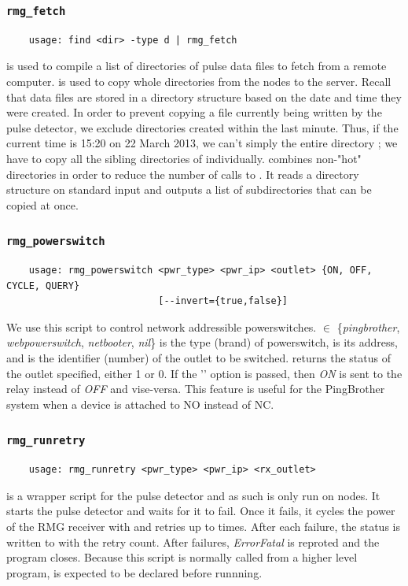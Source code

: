 \documentclass[letter]{article}
\begin{document}
\subsubsection{\texttt{rmg\_fetch}}
\begin{verbatim}
    usage: find <dir> -type d | rmg_fetch 
\end{verbatim}
 is used to compile a list of directories of pulse data files to fetch
from a remote computer.  is used to copy whole directories from the nodes 
to the server. Recall that data files are stored in a directory structure 
based on the date and time they were created. In order to prevent copying a file currently 
being written by the pulse detector, we exclude directories created within the 
last minute. Thus, if the current time is 15:20 on 22 March 2013, we can't simply 
the entire directory ; we have to copy all the sibling
directories of  individually. 
combines non-"hot" directories in order to reduce the number of calls to . It reads
a directory structure on standard input and outputs a list of subdirectories that can be 
copied at once. 
  
  
\subsubsection{\texttt{rmg\_powerswitch}}
\begin{verbatim}
    usage: rmg_powerswitch <pwr_type> <pwr_ip> <outlet> {ON, OFF, CYCLE, QUERY} 
                           [--invert={true,false}]
\end{verbatim}
We use this script to control network addressible powerswitches.  $
\in$ \{\textit{pingbrother}, \textit{webpowerswitch}, \textit{netbooter}, \textit{nil}\} is the 
type (brand) of powerswitch,  is its address, and  is 
the identifier (number) of the outlet to be switched.  returns the status of the 
outlet specified, either 1 or 0. If the '' option is passed, then 
\textit{ON} is sent to the relay instead of \textit{OFF} and vise-versa. This feature is 
useful for the PingBrother system when a device is attached to NO instead of NC. 


\subsubsection{\texttt{rmg\_runretry}}
\begin{verbatim}
    usage: rmg_runretry <pwr_type> <pwr_ip> <rx_outlet>
\end{verbatim}
 is a wrapper script for the pulse detector and as such is only
run on nodes. It starts the pulse detector and waits for it to fail. Once it fails, 
it cycles the power of the RMG receiver with  and retries up 
to  times. After each failure, the status is written to 
with the retry count. After  failures, \textit{ErrorFatal} is reproted and 
the program closes. Because this script is normally called from a higher level
program,  is expected to be declared before runnning.
\end{document}
